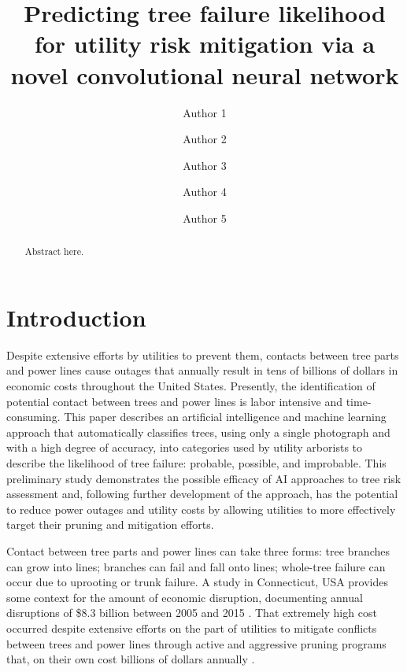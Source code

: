 \documentclass[Journal,letterpaper, SingleSpace, InsideFigs]{ascelike-new}
\begin{document}
\title{Predicting tree failure likelihood for utility risk mitigation via a novel convolutional neural network}
\author[1]{Author 1}
\author[1]{Author 2}
\author[2]{Author 3}
\author[2]{Author 4}
\author[2]{Author 5}


\maketitle

\begin{abstract}
    Abstract here.
\end{abstract}

\section{Introduction}
Despite extensive efforts by utilities to prevent them, contacts between tree parts and power lines cause outages that annually result in tens of billions of dollars in economic costs throughout the United States.  Presently, the identification of potential contact between trees and power lines is labor intensive and time-consuming.  This paper describes an artificial intelligence and machine learning approach that automatically classifies trees, using only a single photograph and with a high degree of accuracy, into categories used by utility arborists to describe the likelihood of tree failure: probable, possible, and improbable.  This preliminary study demonstrates the possible efficacy of AI approaches to tree risk assessment and, following further development of the approach, has the potential to reduce power outages and utility costs by allowing utilities to more effectively target their pruning and mitigation efforts.  

Contact between tree parts and power lines can take three forms: tree branches can grow into lines; branches can fail and fall onto lines; whole-tree failure can occur due to uprooting or trunk failure.  A study in Connecticut, USA provides some context for the amount of economic disruption, documenting annual disruptions of \$8.3 billion between 2005 and 2015 \cite{graziano2020wider}.  That extremely high cost occurred despite extensive efforts on the part of utilities to mitigate conflicts between trees and power lines through active and aggressive pruning programs that, on their own cost billions of dollars annually \cite{guggenmoos2003effects}.  
\end{document}
